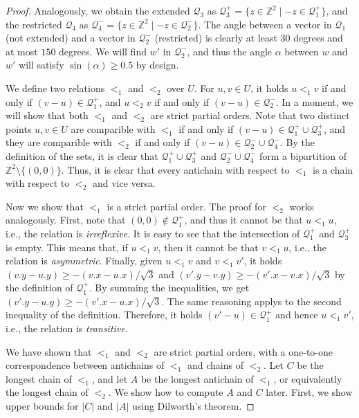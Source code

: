 \documentclass[11pt, letterpaper]{article}
\theoremstyle{plain}
\theoremstyle{definition}
\theoremstyle{remark}
\newcommand{\Q}{\mathcal{Q}}
\newcommand{\absolute}[1]{\lvert#1\rvert}
\begin{document}
\begin{proof}
%
Analogously, we obtain the extended $\Q_3$ as $\Q_3^+ = \{ z \in \mathbb Z^2 \mid -z \in \Q_1^+ \}$, and the restricted $\Q_4$ as $\Q_4^- = \{ z \in \mathbb Z^2 \mid -z \in \Q_2^- \}$. The angle between a vector in $\Q_1$ (not extended) and a vector in $\Q_2^-$ (restricted) is clearly at least $30$ degrees and at most $150$ degrees. We will find $w'$ in $\Q_2^-$, and thus the angle $\alpha$ between $w$ and $w'$ will satisfy $\sin(\alpha) \geq 0.5$ by design.

We define two relations $<_1$ and $<_2$ over $U$. For $u, v \in U$, it holds $u <_1 v$ if and only if $(v - u) \in \Q_1^+$, and $u <_2 v$ if and only if $(v - u) \in \Q_2^-$. In a moment, we will show that both $<_1$ and $<_2$ are strict partial orders. 
Note that two distinct points $u,v \in U$ are comparible with $<_1$ if and only if $(v - u) \in \Q_1^+ \cup \Q_3^+$, and they are comparible with $<_2$ if and only if $(v - u) \in \Q_2^- \cup \Q_4^-$. 
By the definition of the sets, it is clear that $\Q_1^+ \cup \Q_3^+$ and $\Q_2^- \cup \Q_4^-$ form a bipartition of $\mathbb Z^2 \setminus \{(0,0)\}$.
Thus, it is clear that every antichain with respect to $<_1$ is a chain with respect to $<_2$ and vice versa.

Now we show that $<_1$ is a strict partial order. The proof for $<_2$ works analogously. First, note that $(0,0) \notin \Q_1^+$, and thus it cannot be that $u <_1 u$, i.e., the relation is \emph{irreflexive}. It is easy to see that the intersection of $\Q_1^+$ and $\Q_3^+$ is empty. This means that, if $u <_1 v$, then it cannot be that $v <_1 u$, i.e., the relation is \emph{asymmetric}. Finally, given $u <_1 v$ and $v <_1 v'$, it holds $(v.y - u.y) \geq -(v.x-u.x)/\sqrt{3}$ and $(v'.y - v.y) \geq -(v'.x-v.x)/\sqrt{3}$ by the definition of $\Q_1^+$. By summing the inequalities, we get $(v'.y - u.y) \geq -(v'.x-u.x)/\sqrt{3}$. The same reasoning applys to the second inequality of the definition. Therefore, it holds $(v' - u) \in \Q_1^+$ and hence $u <_1 v'$, i.e., the relation is \emph{transitive}.

We have shown that $<_1$ and $<_2$ are strict partial orders, with a one-to-one correspondence between antichains of $<_1$ and chains of $<_2$.
Let $C$ be the longest chain of $<_1$, and let $A$ be the longest antichain of $<_1$, or equivalently the longest chain of $<_2$. We show how to compute $A$ and $C$ later. First, we show upper bounds for $\absolute{C}$ and $\absolute{A}$ using Dilworth's theorem.


\end{proof}
\end{document}
